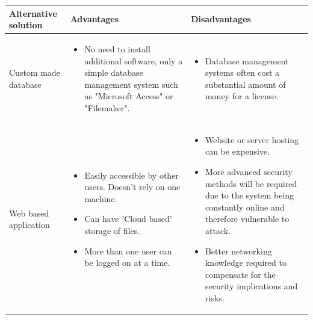 \begin{center}
    \begin{tabular}{|p{3cm}|p{6cm}|p{6cm}|}
        \hline
        \textbf{Alternative solution} & \textbf{Advantages} & \textbf{Disadvantages}\\ \hline
        Custom made database & \begin{itemize} \item No need to install additional software, only a simple database management system such as "Microsoft Access" or "Filemaker". \end{itemize} & \begin{itemize} \item Database management systems often cost a substantial amount of money for a license. \end{itemize}\\ \hline
        Web based application & \begin{itemize} \item Easily accessible by other users. Doesn't rely on one machine. \item Can have 'Cloud based' storage of files. \item More than one user can be logged on at a time. \end{itemize} & \begin{itemize} \item Website or server hosting can be expensive. \item More advanced security methods will be required due to the system being constantly online and therefore vulnerable to attack. \item Better networking knowledge required to compensate for the security implications and risks. \end{itemize}\\ \hline
    \end{tabular}
\end{center}

        

